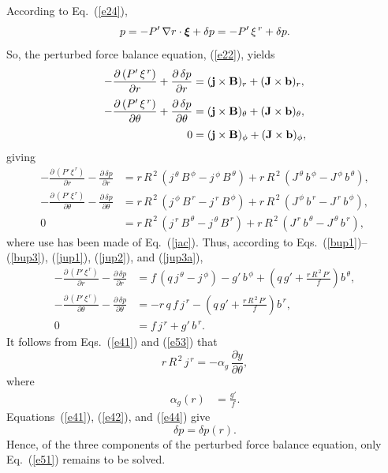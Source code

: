 \documentclass[12pt,prb,aps]{revtex4-1}
\newcommand {\bxi}{\mbox{\boldmath$\xi$}}
\begin{document}
According to Eq.~(\ref{e24}), 
\begin{equation}
p =-P'\,\nabla r\cdot\bxi+\delta p=- P'\,\xi^{\,r}+ \delta p.
\end{equation}
So, the perturbed force balance equation, (\ref{e22}), yields\,\cite{tj}
\begin{align}
-\frac{\partial\, (P'\,\xi^{\,r})}{\partial r}  +\frac{\partial\,\delta p}{\partial r}&= ({\bf j}\times {\bf B})_r+({\bf J}\times {\bf b})_r,\\[0.5ex]
-\frac{\partial\,(P'\,\xi^{\,r})}{\partial \theta} +\frac{\partial\,\delta p}{\partial \theta}&= ({\bf j}\times {\bf B})_\theta+({\bf J}\times {\bf b})_\theta,\\[0.5ex]
0&= ({\bf j}\times {\bf B})_\phi+({\bf J}\times {\bf b})_\phi,
\end{align}
giving\,\cite{tj}
\begin{align}
-\frac{\partial\, (P'\,\xi^{\,r})}{\partial r}-\frac{\partial\,\delta p}{\partial r} &=r\,R^{\,2}\,(j^{\,\theta}\,B^{\,\phi}-j^{\,\phi}\,B^{\,\theta}) + r\,R^{\,2}\,(J^{\,\theta}\,b^{\,\phi}-J^{\,\phi}\,b^{\,\theta}),\\[0.5ex]
-\frac{\partial\,(P'\,\xi^{\,r})}{\partial \theta} -\frac{\partial\,\delta p}{\partial \theta}&=r\,R^{\,2}\,(j^{\,\phi}\,B^{\,r}-j^{\,r}\,B^{\,\phi}) + r\,R^{\,2}\,(J^{\,\phi}\,b^{\,r}-J^{\,r}\,b^{\,\phi}),\\[0.5ex]
0&=r\,R^{\,2}\,(j^{\,r}\,B^{\,\theta}-j^{\,\theta}\,B^{\,r}) + r\,R^{\,2}\,(J^{\,r}\,b^{\,\theta}-J^{\,\theta}\,b^{\,r}),
\end{align}
where use has been made of Eq.~(\ref{jac}). 
Thus, according to Eqs.~(\ref{bup1})--(\ref{bup3}), (\ref{jup1}), (\ref{jup2}), and (\ref{jup3a}), 
\begin{align}
-\frac{\partial\, (P'\,\xi^{\,r})}{\partial r}  -\frac{\partial\,\delta p}{\partial r}&= f\,(q\,j^{\,\theta} -j^{\,\phi}) - g'\,b^{\,\phi} + \left(q\,g'+\frac{r\,R^{\,2}\,P'}{f}\right)b^{\,\theta},\label{e51}\\[0.5ex]
-\frac{\partial\,(P'\,\xi^{\,r})}{\partial \theta} -\frac{\partial\,\delta p}{\partial \theta}&=-r\,q\,f\,j^{\,r} - \left(q\,g'+\frac{r\,R^{\,2}\,P'}{f}\right)b^{\,r},\label{e44}\\[0.5ex]
0&= f\,j^{\,r}+g'\,b^{\,r}.\label{e53}
\end{align}
It follows from Eqs.~(\ref{e41}) and (\ref{e53}) that 
\begin{equation}\label{e54}
r\,R^{\,2}\,j^{\,r} = -\alpha_g\,\frac{\partial y}{\partial\theta},
\end{equation}
where
\begin{align}
\alpha_g (r)&= \frac{g'}{f}.\label{ag}
\end{align}
Equations~(\ref{e41}), (\ref{e42}), and (\ref{e44}) give 
\begin{equation}\label{e54a}
\delta p = \delta p(r).
\end{equation}
Hence, of the three components of the perturbed force balance equation, only Eq.~(\ref{e51}) remains to be solved. 
\end{document}
